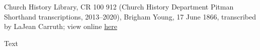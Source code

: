 					Church History Library, CR 100 912 (Church History Department Pitman Shorthand transcriptions, 2013--2020), Brigham Young, 17 June 1866, transcribed by LaJean Carruth; view online \href{https://catalog.churchofjesuschrist.org/assets/d27681eb-6a9d-4dd2-9775-660bcfa6c4e6/0/0}{here}
				
				\begin{description}
					\item[Text]
				\end{description}
				
